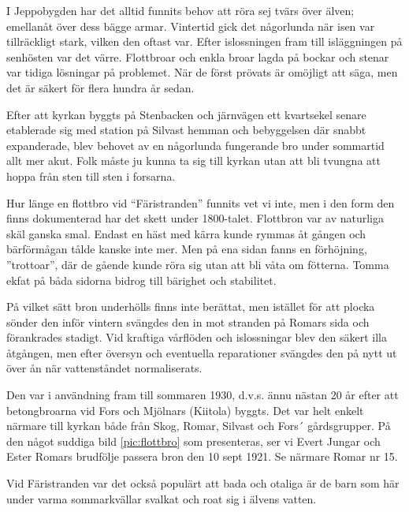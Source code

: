 
I Jeppobygden har det alltid funnits behov att röra sej tvärs över älven; emellanåt över dess bägge armar. Vintertid gick det någorlunda när isen var tillräckligt stark, vilken den oftast var. Efter islossningen fram till isläggningen på senhösten var det värre. Flottbroar och enkla broar lagda på bockar och stenar var tidiga lösningar på problemet. När de först prövats är omöjligt att säga, men det är säkert för flera hundra år sedan.

Efter att kyrkan byggts på Stenbacken och järnvägen ett kvartsekel senare etablerade sig med station på Silvast hemman och bebyggelsen där snabbt expanderade, blev behovet av en någorlunda fungerande bro under sommartid allt mer akut. Folk måste ju kunna ta sig till kyrkan utan att bli tvungna att hoppa från sten till sten i forsarna.

Hur länge en flottbro vid ``Färistranden'' funnits vet vi inte, men i den form den finns dokumenterad har det skett under 1800-talet. Flottbron var av naturliga skäl ganska smal. Endast en häst med kärra kunde rymmas åt gången och bärförmågan tålde kanske inte mer. Men på  ena sidan fanns en förhöjning, ”trottoar”, där de gående kunde röra sig utan att bli våta om fötterna. Tomma ekfat på båda sidorna bidrog till bärighet och stabilitet.

På vilket sätt bron underhölls finns inte berättat, men istället för att plocka sönder den inför vintern svängdes den in mot stranden på Romars sida och förankrades stadigt. Vid kraftiga vårflöden och islossningar blev den säkert illa åtgången, men efter översyn och eventuella reparationer svängdes den på nytt ut över ån när vattenståndet normaliserats.

Den var i användning fram till sommaren 1930, d.v.s. ännu nästan 20 år efter att betongbroarna vid Fors och Mjölnars (Kiitola) byggts. Det var helt enkelt närmare till kyrkan både från Skog, Romar, Silvast och Fors´ gårdsgrupper. På den något suddiga bild \ref{pic:flottbro} som presenteras, ser vi Evert Jungar och Ester Romars brudfölje passera bron den 10 sept 1921. Se närmare Romar nr 15.

Vid Färistranden var det också populärt att bada och otaliga är de barn som här under varma sommarkvällar svalkat och roat sig i älvens vatten.


